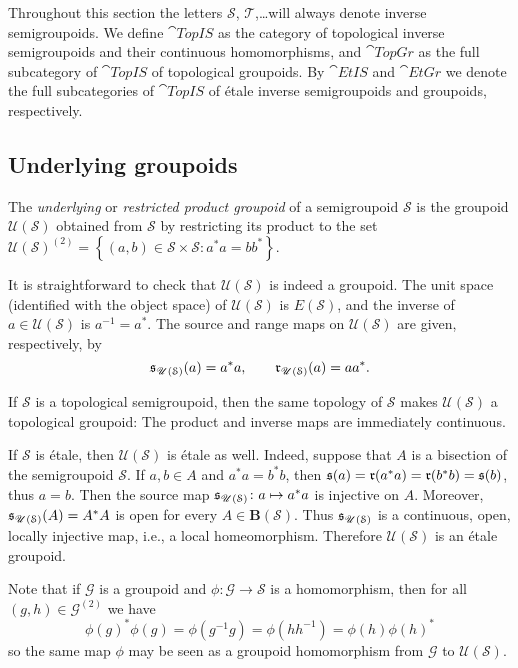 Throughout this section the letters $\mathcal{S}$, $\mathcal{T}$,\ldots will always denote inverse semigroupoids. We define $\cat{TopIS}$ as the category of topological inverse semigroupoids and their continuous homomorphisms, and $\cat{TopGr}$ as the full subcategory of $\cat{TopIS}$ of topological groupoids. By $\cat{EtIS}$ and $\cat{EtGr}$ we denote the full subcategories of $\cat{TopIS}$ of étale inverse semigroupoids and groupoids, respectively.

\subsection{Underlying groupoids}
\begin{definition}
The \emph{underlying} or \emph{restricted product groupoid} of a semigroupoid $\mathcal{S}$ is the groupoid $\mathscr{U}(\mathcal{S})$ obtained from $\mathcal{S}$ by restricting its product to the set $\mathscr{U}(\mathcal{S})^{(2)}=\left\{(a,b)\in \mathcal{S}\times \mathcal{S}:a^*a=bb^*\right\}$.
\end{definition}

It is straightforward to check that $\mathscr{U}(\mathcal{S})$ is indeed a groupoid. The unit space (identified with the object space) of $\mathscr{U}(\mathcal{S})$ is $E(\mathcal{S})$, and the inverse of $a\in\mathscr{U}(\mathcal{S})$ is $a^{-1}=a^*$. The source and range maps on $\mathscr{U}(\mathcal{S})$ are given, respectively, by
\[\operatorname{\mathfrak{s}}_{\mathscr{U}(\mathcal{S})}(a)=a^*a,\qquad\operatorname{\mathfrak{r}}_{\mathscr{U}(\mathcal{S})}(a)=aa^*.\]

If $\mathcal{S}$ is a topological semigroupoid, then the same topology of $\mathcal{S}$ makes $\mathscr{U}(\mathcal{S})$ a topological groupoid: The product and inverse maps are immediately continuous.

If $\mathcal{S}$ is étale, then $\mathscr{U}(\mathcal{S})$ is étale as well. Indeed, suppose that $A$ is a bisection of the semigroupoid $\mathcal{S}$. If $a,b\in A$ and $a^*a=b^*b$, then $\operatorname{\mathfrak{s}}(a)=\operatorname{\mathfrak{r}}(a^*a)=\operatorname{\mathfrak{r}}(b^*b)=\operatorname{\mathfrak{s}}(b)$, thus $a=b$. Then the source map $\operatorname{\mathfrak{s}}_{\mathscr{U}(\mathcal{S})}\colon a\mapsto a^*a$ is injective on $A$. Moreover, $\operatorname{\mathfrak{s}}_{\mathscr{U}(\mathcal{S})}(A)=A^*A$ is open for every $A\in\mathbf{B}(\mathcal{S})$. Thus $\operatorname{\mathfrak{s}}_{\mathscr{U}(\mathcal{S})}$ is a continuous, open, locally injective map, i.e., a local homeomorphism. Therefore $\mathscr{U}(\mathcal{S})$ is an étale groupoid.

Note that if $\mathcal{G}$ is a groupoid and $\phi\colon\mathcal{G}\to\mathcal{S}$ is a homomorphism, then for all $(g,h)\in\mathcal{G}^{(2)}$ we have
\[\phi(g)^*\phi(g)=\phi(g^{-1}g)=\phi(hh^{-1})=\phi(h)\phi(h)^*\]
so the same map $\phi$ may be seen as a groupoid homomorphism from $\mathcal{G}$ to $\mathscr{U}(\mathcal{S})$.

